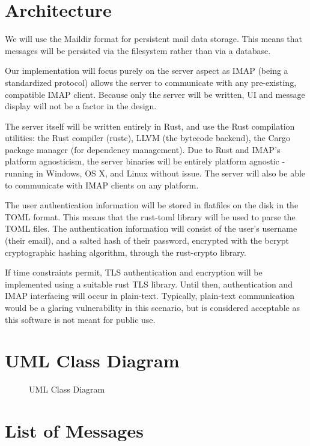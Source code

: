 \documentclass[a4paper,12pt]{article}
\begin{document}
\section*{Architecture}

We will use the Maildir format for persistent mail data storage. This means that messages will be persisted via the filesystem rather than via a database.

Our implementation will focus purely on the server aspect as IMAP (being a standardized protocol) allows the server to communicate with any pre-existing, compatible IMAP client. Because only the server will be written, UI and message display will not be a factor in the design.

The server itself will be written entirely in Rust, and use the Rust compilation utilities: the Rust compiler (rustc), LLVM (the bytecode backend), the Cargo package manager (for dependency management). Due to Rust and IMAP's platform agnosticism, the server binaries will be entirely platform agnostic - running in Windows, OS X, and Linux without issue. The server will also be able to communicate with IMAP clients on any platform.

The user authentication information will be stored in flatfiles on the disk in the TOML format. This means that the rust-toml library will be used to parse the TOML files. The authentication information will consist of the user's username (their email), and a salted hash of their password, encrypted with the bcrypt cryptographic hashing algorithm, through the rust-crypto library.

If time constraints permit, TLS authentication and encryption will be implemented using a suitable rust TLS library. Until then, authentication and IMAP interfacing will occur in plain-text. Typically, plain-text communication would be a glaring vulnerability in this scenario, but is considered acceptable as this software is not meant for public use.

\section*{UML Class Diagram}

\begin{figure}[H]
    \centering
    
    \caption{UML Class Diagram}
\end{figure}

\section*{List of Messages}
\end{document}
